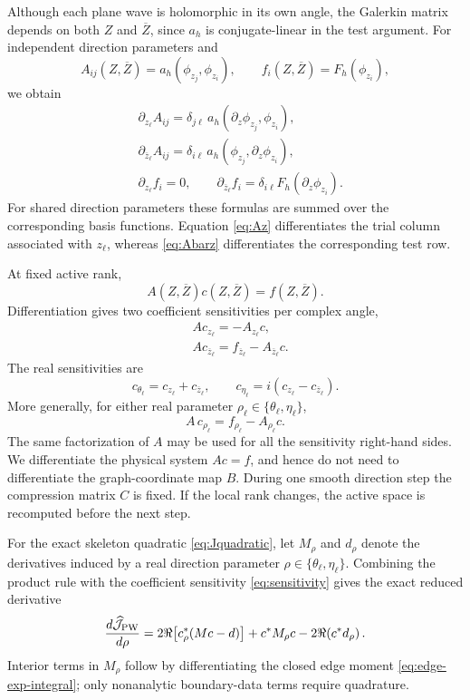 \documentclass[pdflatex,sn-mathphys-num]{sn-jnl}
\theoremstyle{thmstyleone}
\theoremstyle{thmstyletwo}
\begin{document}
Although each plane wave is holomorphic in its own angle, the Galerkin matrix depends on both $Z$ and $\overline Z$, since $a_h$ is conjugate-linear in the test argument.  For independent direction parameters and
\[
 A_{ij}(Z,\overline Z)=a_h(\phi_{z_j},\phi_{z_i}),
 \qquad
 f_i(Z,\overline Z)=F_h(\phi_{z_i}),
\]
we obtain
\begin{align}
 &\partial_{z_\ell}A_{ij}
 =\delta_{j\ell}\,a_h(\partial_z\phi_{z_j},\phi_{z_i}),
 \label{eq:Az}\\
 &\partial_{\overline z_\ell}A_{ij}
 =\delta_{i\ell}\,a_h(\phi_{z_j},\partial_z\phi_{z_i}),
 \label{eq:Abarz}\\
 &\partial_{z_\ell}f_i=0,
 \qquad
 \partial_{\overline z_\ell}f_i
 =\delta_{i\ell}F_h(\partial_z\phi_{z_i}).
 \label{eq:f-wirt}
\end{align}
For shared direction parameters these formulas are summed over the corresponding basis functions.  Equation \eqref{eq:Az} differentiates the trial column associated with $z_\ell$, whereas \eqref{eq:Abarz} differentiates the corresponding test row.

At fixed active rank,
\[
 A(Z,\overline Z)c(Z,\overline Z)=f(Z,\overline Z).
\]
Differentiation gives two coefficient sensitivities per complex angle,
\begin{align}
 &A c_{z_\ell}
 =-A_{z_\ell}c,
 \label{eq:cz}\\
 &A c_{\overline z_\ell}
 =f_{\overline z_\ell}-A_{\overline z_\ell}c.
 \label{eq:cbarz}
\end{align}
The real sensitivities are
\begin{equation}\label{eq:real-from-wirt}
 c_{\theta_\ell}=c_{z_\ell}+c_{\overline z_\ell},
 \qquad
 c_{\eta_\ell}=i(c_{z_\ell}-c_{\overline z_\ell}).
\end{equation}
More generally, for either real parameter $\rho_\ell\in\{\theta_\ell,\eta_\ell\}$,
\begin{equation}\label{eq:sensitivity}
 A\,c_{\rho_\ell}
 =f_{\rho_\ell}-A_{\rho_\ell}c.
\end{equation}
The same factorization of $A$ may be used for all the sensitivity right-hand sides.  We differentiate the physical system $Ac=f$, and hence do not need to differentiate the graph-coordinate map $B$.  During one smooth direction step the compression matrix $C$ is fixed.  If the local rank changes, the active space is recomputed before the next step.

For the exact skeleton quadratic \eqref{eq:Jquadratic}, let $M_\rho$ and $d_\rho$ denote the derivatives induced by a real direction parameter $\rho\in\{\theta_\ell,\eta_\ell\}$.  Combining the product rule with the coefficient sensitivity \eqref{eq:sensitivity} gives the exact reduced derivative
\begin{equation}\label{eq:Jexact-gradient}
 {
 \frac{d\widehat{\mathcal J}_{\rm PW}}{d\rho}
 =2\Re\!\left[c_\rho^*(Mc-d)\right]
 +c^*M_\rho c-2\Re\!\left(c^*d_\rho\right).}
\end{equation}
Interior terms in $M_\rho$ follow by differentiating the closed edge moment \eqref{eq:edge-exp-integral}; only nonanalytic boundary-data terms require quadrature.
\end{document}
